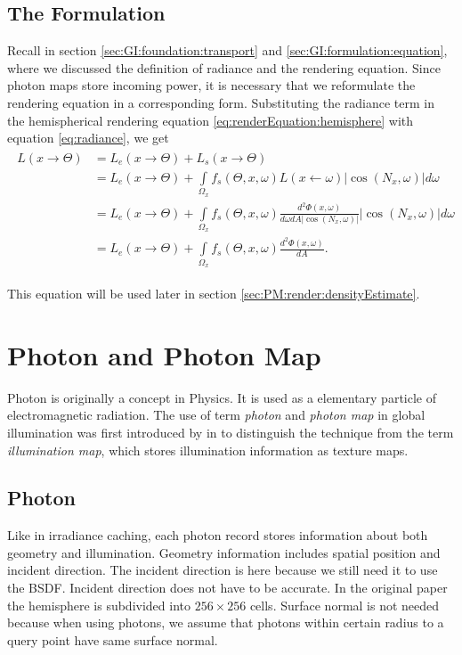 \documentclass[]{book}
\begin{document}
\subsection{The Formulation}
\label{sec:PM:overview:formulation}
Recall in section \ref{sec:GI:foundation:transport} and \ref{sec:GI:formulation:equation}, where we discussed the definition of radiance and the rendering equation.
Since photon maps store incoming power, it is necessary that we reformulate the rendering equation in a corresponding form.
Substituting the radiance term in the hemispherical rendering equation \ref{eq:renderEquation:hemisphere} with equation \ref{eq:radiance}, we get
\begin{gather}
\begin{aligned}
	L(x \rightarrow \Theta) &= L_{e}(x \rightarrow \Theta) + L_{s}(x \rightarrow \Theta) \\
	&= L_{e}(x \rightarrow \Theta) + \int\limits_{\Omega_{x}} f_{s}(\Theta, x, \omega) L(x \leftarrow \omega) \left | \cos(N_{x}, \omega)\right | d\omega\\
	&= L_{e}(x \rightarrow \Theta) + \int\limits_{\Omega_{x}} f_{s}(\Theta, x, \omega) \frac{d^2 \Phi(x, \omega)}{d \omega d A \left| \cos(N_{x}, \omega)\right|} \left| \cos(N_{x}, \omega)\right| d\omega\\
	&= L_{e}(x \rightarrow \Theta) + \int\limits_{\Omega_{x}} f_{s}(\Theta, x, \omega) \frac{d^2 \Phi(x, \omega)}{d A}.
\end{aligned}
\label{eq:PM:formulation}
\end{gather}

This equation will be used later in section \ref{sec:PM:render:densityEstimate}.

\section{Photon and Photon Map}
\label{sec:PM:data}
Photon is originally a concept in Physics.
It is used as a elementary particle of electromagnetic radiation.
The use of term \textit{photon} and \textit{photon map} in global illumination was first introduced by \citeauthor{jensen1995photon} in \citeyear{jensen1995photon} \cite{jensen1995photon} to distinguish the technique from the term \textit{illumination map}, which stores illumination information as texture maps.

\subsection{Photon}
\label{sec:PM:data:photon}
Like in irradiance caching, each photon record stores information about both geometry and illumination.
Geometry information includes spatial position and incident direction.
The incident direction is here because we still need it to use the BSDF.
Incident direction does not have to be accurate.
In the original paper the hemisphere is subdivided into $256 \times 256$ cells.
Surface normal is not needed because when using photons, we assume that photons within certain radius to a query point have same surface normal.
\end{document}
